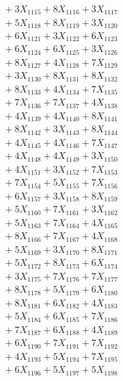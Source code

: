 \documentclass[a4paper,10pt]{article}
\begin{document}
{\begin{align}
&\;  + 3 X_{1115} + 8 X_{1116} + 3 X_{1117} \\[0.3ex]
&\;  + 5 X_{1118} + 8 X_{1119} + 3 X_{1120} \\[0.5ex]\allowbreak
&\;  + 6 X_{1121} + 3 X_{1122} + 6 X_{1123} \\[0.3ex]
&\;  + 6 X_{1124} + 6 X_{1125} + 3 X_{1126} \\[0.3ex]
&\;  + 8 X_{1127} + 4 X_{1128} + 7 X_{1129} \\[0.3ex]
&\;  + 3 X_{1130} + 8 X_{1131} + 8 X_{1132} \\[0.3ex]
&\;  + 8 X_{1133} + 4 X_{1134} + 7 X_{1135} \\[0.3ex]
&\;  + 7 X_{1136} + 7 X_{1137} + 4 X_{1138} \\[0.3ex]
&\;  + 4 X_{1139} + 4 X_{1140} + 8 X_{1141} \\[0.3ex]
&\;  + 8 X_{1142} + 3 X_{1143} + 8 X_{1144} \\[0.3ex]
&\;  + 4 X_{1145} + 4 X_{1146} + 7 X_{1147} \\[0.3ex]
&\;  + 4 X_{1148} + 4 X_{1149} + 3 X_{1150} \\[0.5ex]\allowbreak
&\;  + 4 X_{1151} + 3 X_{1152} + 7 X_{1153} \\[0.3ex]
&\;  + 7 X_{1154} + 5 X_{1155} + 7 X_{1156} \\[0.3ex]
&\;  + 6 X_{1157} + 3 X_{1158} + 8 X_{1159} \\[0.3ex]
&\;  + 5 X_{1160} + 7 X_{1161} + 3 X_{1162} \\[0.3ex]
&\;  + 5 X_{1163} + 7 X_{1164} + 4 X_{1165} \\[0.3ex]
&\;  + 8 X_{1166} + 7 X_{1167} + 4 X_{1168} \\[0.3ex]
&\;  + 5 X_{1169} + 3 X_{1170} + 8 X_{1171} \\[0.3ex]
&\;  + 5 X_{1172} + 8 X_{1173} + 6 X_{1174} \\[0.3ex]
&\;  + 3 X_{1175} + 7 X_{1176} + 7 X_{1177} \\[0.3ex]
&\;  + 8 X_{1178} + 5 X_{1179} + 6 X_{1180} \\[0.5ex]\allowbreak
&\;  + 8 X_{1181} + 6 X_{1182} + 4 X_{1183} \\[0.3ex]
&\;  + 5 X_{1184} + 6 X_{1185} + 7 X_{1186} \\[0.3ex]
&\;  + 7 X_{1187} + 6 X_{1188} + 4 X_{1189} \\[0.3ex]
&\;  + 6 X_{1190} + 7 X_{1191} + 7 X_{1192} \\[0.3ex]
&\;  + 4 X_{1193} + 5 X_{1194} + 7 X_{1195} \\[0.3ex]
&\;  + 6 X_{1196} + 5 X_{1197} + 5 X_{1198} \\[0.3ex]

\end{align}}
\end{document}
